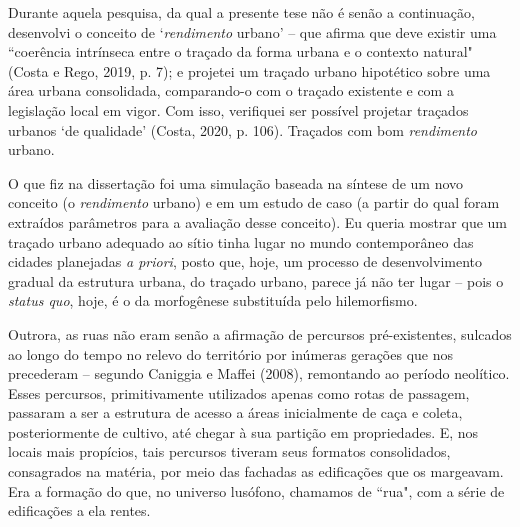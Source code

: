 \documentclass[]{report}
\begin{document}
	
	Durante aquela pesquisa, da qual a presente tese não é senão a continuação, desenvolvi o conceito de `\textit{rendimento} urbano' – que afirma que deve existir uma ``coerência intrínseca entre o traçado da forma urbana e o contexto natural" (Costa e Rego, 2019, p. 7); e projetei um traçado urbano hipotético sobre uma área urbana consolidada, comparando-o com o traçado existente e com a legislação local em vigor. Com isso, verifiquei ser possível projetar traçados urbanos `de qualidade' (Costa, 2020, p. 106). Traçados com bom \textit{rendimento} urbano. %
	



	O que fiz na dissertação foi uma simulação baseada na síntese de um novo conceito (o \textit{rendimento} urbano) e em um estudo de caso (a partir do qual foram extraídos parâmetros para a avaliação desse conceito). Eu queria mostrar que um traçado urbano adequado ao sítio tinha lugar no mundo contemporâneo das cidades planejadas \textit{a priori}, posto que, hoje, um processo de desenvolvimento gradual da estrutura urbana, do traçado urbano, parece já não ter lugar – pois o \textit{status quo}, hoje, é o da morfogênese substituída pelo hilemorfismo. 
	
	Outrora, as ruas não eram senão a afirmação de percursos pré-existentes, sulcados ao longo do tempo no relevo do território por inúmeras gerações que nos precederam – segundo Caniggia e Maffei (2008), remontando ao período neolítico. Esses percursos, primitivamente utilizados apenas como rotas de passagem, passaram a ser a estrutura de acesso a áreas inicialmente de caça e coleta, posteriormente de cultivo, até chegar à sua partição em propriedades. E, nos locais mais propícios, tais percursos tiveram seus formatos consolidados, consagrados na matéria, por meio das fachadas as edificações que os margeavam. Era a formação do que, no universo lusófono, chamamos de ``rua", com a série de edificações a ela rentes.
	
\end{document}
